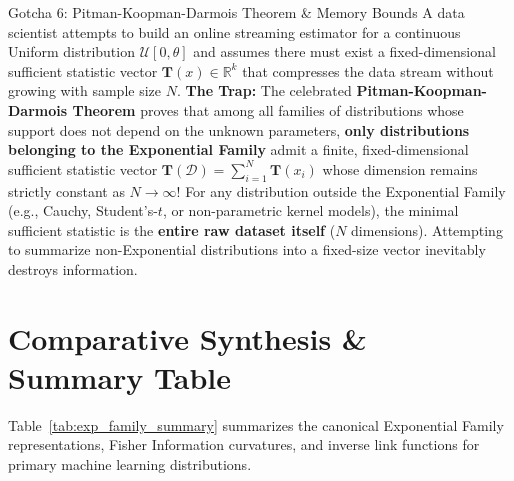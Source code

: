 \begin{trapbox}{Gotcha 6: Pitman-Koopman-Darmois Theorem \& Memory Bounds}
A data scientist attempts to build an online streaming estimator for a continuous Uniform distribution $\mathcal{U}[0, \theta]$ and assumes there must exist a fixed-dimensional sufficient statistic vector $\mathbf{T}(x) \in \mathbb{R}^k$ that compresses the data stream without growing with sample size $N$.
\textbf{The Trap:} The celebrated \textbf{Pitman-Koopman-Darmois Theorem} proves that among all families of distributions whose support does not depend on the unknown parameters, \textbf{only distributions belonging to the Exponential Family} admit a finite, fixed-dimensional sufficient statistic vector $\mathbf{T}(\mathcal{D}) = \sum_{i=1}^N \mathbf{T}(x_i)$ whose dimension remains strictly constant as $N \to \infty$!
For any distribution outside the Exponential Family (e.g., Cauchy, Student's-$t$, or non-parametric kernel models), the minimal sufficient statistic is the \textbf{entire raw dataset itself} ($N$ dimensions). Attempting to summarize non-Exponential distributions into a fixed-size vector inevitably destroys information.
\end{trapbox}

\section{Comparative Synthesis \& Summary Table}

Table~\ref{tab:exp_family_summary} summarizes the canonical Exponential Family representations, Fisher Information curvatures, and inverse link functions for primary machine learning distributions.


